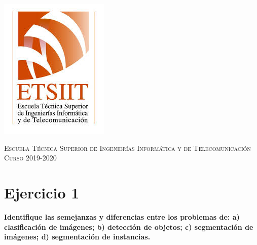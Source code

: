 \documentclass[11pt,a4paper]{article}
\begin{document}
\begin{titlepage}
\begin{minipage}{\textwidth}
\includegraphics[scale=0.3]{img/etsiit.jpeg}

\vspace{0.7cm}
\textsc{Escuela Técnica Superior de Ingenierías Informática y de Telecomunicación}\\
\vspace{1cm}
\textsc{Curso 2019-2020}
\end{minipage}
\end{titlepage}

\tableofcontents
\thispagestyle{empty}				%

\newpage

\setlength{\parskip}{1em}


\section*{Ejercicio 1}

\textbf{Identifique las semejanzas y diferencias entre los problemas de: a) clasificación de imágenes; b) detección de objetos;
c) segmentación de imágenes; d) segmentación de instancias.}
\end{document}
